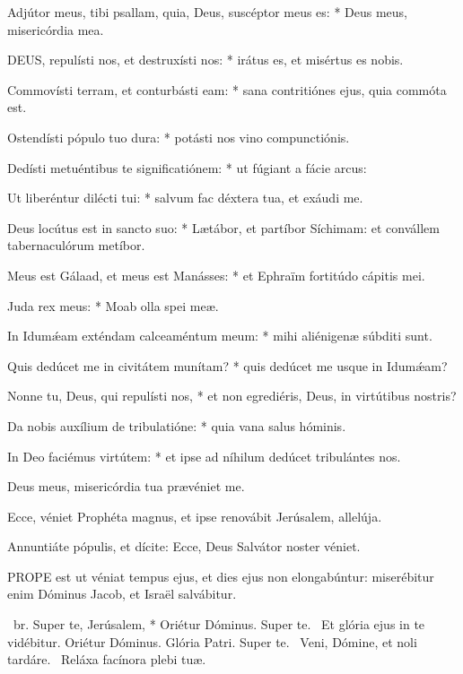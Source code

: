 Adjútor meus, tibi psallam, quia, Deus, suscéptor meus es: * Deus meus, misericórdia mea.


\lettrine[lines=2]{D}{EUS}, repulísti nos, et destruxísti nos: * irátus es, et misértus es nobis.

Commovísti terram, et conturbásti eam: * sana contritiónes ejus, quia commóta est.

Ostendísti pópulo tuo dura: * potásti nos vino compunctiónis.

Dedísti metuéntibus te significatiónem: * ut fúgiant a fácie arcus:

Ut liberéntur dilécti tui: * salvum fac déxtera tua, et exáudi me.

Deus locútus est in sancto suo: * Lætábor, et partíbor Síchimam: et convállem tabernaculórum metíbor.

Meus est Gálaad, et meus est Manásses: * et Ephraïm fortitúdo cápitis mei.

Juda rex meus: * Moab olla spei meæ.

In Idumǽam exténdam calceaméntum meum: * mihi aliénigenæ súbditi sunt.

Quis dedúcet me in civitátem munítam? * quis dedúcet me usque in Idumǽam?

Nonne tu, Deus, qui repulísti nos, * et non egrediéris, Deus, in virtútibus nostris?

Da nobis auxílium de tribulatióne: * quia vana salus hóminis.

In Deo faciémus virtútem: * et ipse ad níhilum dedúcet tribulántes nos.

  Deus meus, misericórdia tua prævéniet me.


  Ecce, véniet Prophéta magnus, et ipse renovábit Jerúsalem, allelúja.

  Annuntiáte pópulis, et dícite: Ecce, Deus Salvátor noster véniet.


\lettrine[lines=2]{P}{ROPE} est ut véniat tempus ejus, et dies ejus non elongabúntur: miserébitur enim Dóminus Jacob, et Israël salvábitur.

\R\ br. Super te, Jerúsalem, * Oriétur Dóminus. Super te. \V\ Et glória ejus in te vidébitur. Oriétur Dóminus. Glória Patri. Super te. \V\ Veni, Dómine, et noli tardáre. \R\ Reláxa facínora plebi tuæ.

